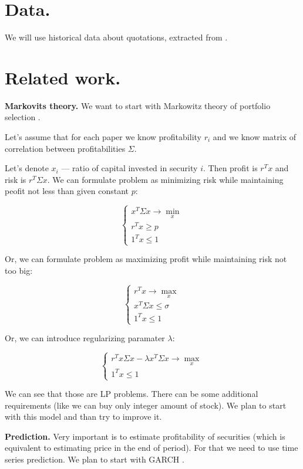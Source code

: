 \documentclass[a4paper, 12pt]{article}
\begin{document}
\section{Data.}

We will use historical data about quotations, extracted from \cite{finam}.

\section{Related work.}

\textbf{Markovits theory.} We want to start with Markowitz theory of portfolio selection \cite{mark}.

Let’s assume that for each paper we know profitability $r_i$ and we know matrix of correlation between profitabilities $\Sigma$.

Let's denote $x_i$ --- ratio of capital invested in security $i$. Then profit is $r^Tx$ and risk is $r^T \Sigma x$.
We can formulate problem as minimizing risk while maintaining peofit not less than given constant $p$:

$$\begin{cases}
  x^T \Sigma x \to \underset{x}{\min} \\
	r^T x  \ge p \\
	1^T x \le 1
\end{cases}$$

Or, we can formulate problem as maximizing profit while maintaining risk not too big:

$$\begin{cases}
  r^T x \to \underset{x}{\max} \\
	x^T \Sigma x \le \sigma\\
	1^T x \le 1
\end{cases}$$

Or, we can introduce regularizing paramater $\lambda$:

$$\begin{cases} 
	r^T x \Sigma x - \lambda x^T \Sigma x \to \underset{x}{\max} \\
	1^T x \le 1
\end{cases}$$

We can see that those are LP problems. There can be some additional requirements (like we can buy only integer amount of stock).
We plan to start with this model and than try to improve it. 


\textbf{Prediction.} Very important is to estimate profitability of securities (which is equivalent to estimating price in 
the end of period). For that we need to use time series prediction. We plan to start with GARCH \cite{engle}.
\end{document}
